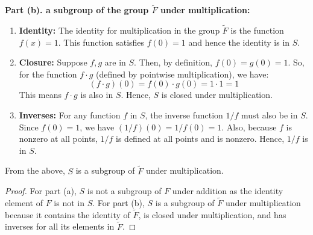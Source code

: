 \documentclass[12pt]{amsart}
\theoremstyle{definition}
\numberwithin{equation}{section}
\theoremstyle{plain}
\begin{document}
\begin{exercise}{17}
\textbf{Part (b). a subgroup of the group \( \tilde{F} \) under multiplication:} 
\begin{enumerate}
    \item \textbf{Identity:} The identity for multiplication in the group \( \tilde{F} \) is the function \( f(x) = 1 \). This function satisfies \( f(0) = 1 \) and hence the identity is in \( S \).
    \item \textbf{Closure:} Suppose \( f, g \) are in \( S \). Then, by definition, \( f(0) = g(0) = 1 \). So, for the function \( f \cdot g \) (defined by pointwise multiplication), we have:
     \[ (f \cdot g)(0) = f(0) \cdot g(0) = 1 \cdot 1 = 1 \] This means \( f \cdot g \) is also in \( S \). Hence, \( S \) is closed under multiplication.
    \item \textbf{Inverses:} For any function \( f \) in \( S \), the inverse function \( 1/f \) must also be in \( S \). Since \( f(0) = 1 \), we have \( (1/f)(0) = 1/f(0) = 1 \). Also, because \( f \) is nonzero at all points, \( 1/f \) is defined at all points and is nonzero. Hence, \( 1/f \) is in \( S \). 
\end{enumerate}
 From the above, \( S \) is a subgroup of \( \tilde{F} \) under multiplication.
 \begin{proof}
 For part (a), \( S \) is not a subgroup of \( F \) under addition as the identity element of \( F \) is not in \( S \).
 For part (b), \( S \) is a subgroup of \( \tilde{F} \) under multiplication because it contains the identity of \( \tilde{F} \), is closed under multiplication, and has inverses for all its elements in \( \tilde{F} \).
 \end{proof}
    \end{exercise}
\end{document}
